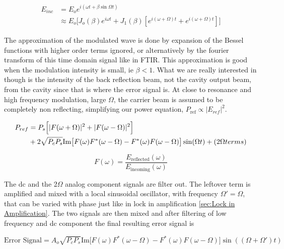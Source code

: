 \documentclass[11pt,a4paper]{book}
\begin{document}
		\begin{equation}
			\begin{split}
			E_{inc} & = E_o e^{i(\omega t + \beta\sin{\Omega t})}\\
			& \approx E_o \Big[J_o(\beta) e^{i\omega t} 
			+J_1(\beta)[e^{i(\omega +\Omega)t} +e^{i(\omega + \Omega)t}]\Big]
			\end{split}
		\end{equation}
		
		The approximation of the modulated wave is done by expansion of the Bessel functions with higher order terms ignored, or alternatively by the fourier transform of this time domain signal like in FTIR. This approximation is good when the modulation intensity is small, ie $\beta < 1$. What we are really interested in though is the intensity of the back reflection beam, not the cavity output beam, from the cavity since that is where the error signal is. At close to resonance and high frequency modulation, large $\Omega$, the carrier beam is assumed to be completely non reflecting, simplifying our power equation, $P_{\text{ref}}\propto |E_{ref}|^2$.
		
		\begin{equation}
			\begin{split}
			P_{ref} & = P_s\Big[|F(\omega +\Omega)|^2+|F(\omega -\Omega)|^2\Big]\\
			& + 2\sqrt{P_c P_s} \space \text{Im}  \big[ F(\omega)F^*(\omega - \Omega)-F^*(\omega) F(\omega - \Omega) \big]\sin (\Omega t)+(2\Omega terms)\\
			\end{split}
		\end{equation}
		
		\begin{equation}
			F(\omega)=\frac{E_\text{reflected}(\omega)}{E_\text{incoming}(\omega)}
		\end{equation}
		
		The dc and the 2$\Omega$ analog component signals are filter out. The leftover term is amplified and mixed with a local sinusoidal oscillator, with frequency $\Omega' = \Omega$, that can be varied with phase just like in lock in amplification \autoref{sec:Lock in Amplification}. The two signals are then mixed and after filtering of low frequency and dc component the final resulting error signal is
		
		\begin{equation}
			\text{Error Signal}= A_o \sqrt{P_c P_s} \text{Im}\big[F(\omega)F^*(\omega - \Omega)-F^*(\omega) F(\omega - \Omega) \big]\sin((\Omega + \Omega')t)
		\end{equation}
%
		
\end{document}
